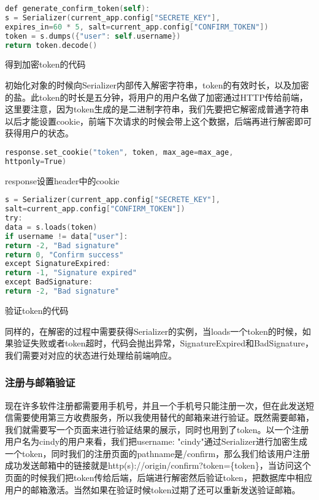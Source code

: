\begin{lstlisting}[language=C]
def generate_confirm_token(self):
s = Serializer(current_app.config["SECRETE_KEY"],
expires_in=60 * 5, salt=current_app.config["CONFIRM_TOKEN"])
token = s.dumps({"user": self.username})
return token.decode()
\end{lstlisting}

\begin{center}
	{\small 得到加密token的代码}
\end{center}

初始化对象的时候向Serializer内部传入解密字符串，token的有效时长，以及加密的盐。此token的时长是五分钟，将用户的用户名做了加密通过HTTP传给前端，这里要注意，因为token生成的是二进制字符串，我们先要把它解密成普通字符串以后才能设置cookie，前端下次请求的时候会带上这个数据，后端再进行解密即可获得用户的状态。

\begin{lstlisting}[language=C]
response.set_cookie("token", token, max_age=max_age, 
httponly=True)
\end{lstlisting}

\begin{center}
	{\small response设置header中的cookie}
\end{center}

\begin{lstlisting}[language=C]
s = Serializer(current_app.config["SECRETE_KEY"], 
salt=current_app.config["CONFIRM_TOKEN"])
try:
data = s.loads(token)
if username != data["user"]:
return -2, "Bad signature"
return 0, "Confirm success"
except SignatureExpired:
return -1, "Signature expired"
except BadSignature:
return -2, "Bad signature"
\end{lstlisting}

\begin{center}
	{\small 验证token的代码}
\end{center}

同样的，在解密的过程中需要获得Serializer的实例，当loads一个token的时候，如果验证失败或者token超时，代码会抛出异常，SignatureExpired和BadSignature，我们需要对对应的状态进行处理给前端响应。

\subsubsection{注册与邮箱验证}

现在许多软件注册都需要用手机号，并且一个手机号只能注册一次，但在此发送短信需要使用第三方收费服务，所以我使用替代的邮箱来进行验证。既然需要邮箱，我们就需要写一个页面来进行验证结果的展示，同时也用到了token。以一个注册用户名为cindy的用户来看，我们把{username: "cindy"}通过Serializer进行加密生成一个token，同时我们的注册页面的pathname是/confirm，那么我们给该用户注册成功发送邮箱中的链接就是http(s)://origin/confirm?token=\{token\}，当访问这个页面的时候我们把token传给后端，后端进行解密然后验证token，把数据库中相应用户的邮箱激活。当然如果在验证时候token过期了还可以重新发送验证邮箱。

